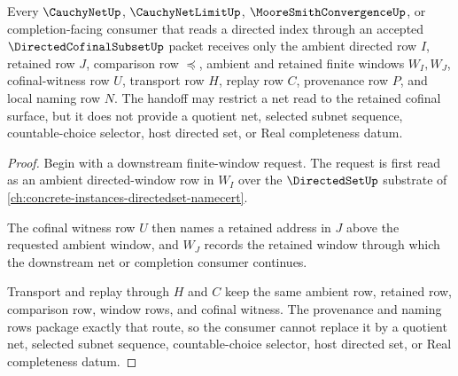 \begin{theorem}
\label{thm:directed-cofinal-subset-net-handoff}
Every $\CauchyNetUp$, $\CauchyNetLimitUp$, $\MooreSmithConvergenceUp$, or completion-facing consumer that reads a directed index through an accepted $\DirectedCofinalSubsetUp$ packet receives only the ambient directed row $I$, retained row $J$, comparison row $\preceq$, ambient and retained finite windows $W_I,W_J$, cofinal-witness row $U$, transport row $H$, replay row $C$, provenance row $P$, and local naming row $N$. The handoff may restrict a net read to the retained cofinal surface, but it does not provide a quotient net, selected subnet sequence, countable-choice selector, host directed set, or Real completeness datum.
\end{theorem}
\begin{proof}
Begin with a downstream finite-window request. The request is first read as an ambient directed-window row in $W_I$ over the $\DirectedSetUp$ substrate of \autoref{ch:concrete-instances-directedset-namecert}.

The cofinal witness row $U$ then names a retained address in $J$ above the requested ambient window, and $W_J$ records the retained window through which the downstream net or completion consumer continues.

Transport and replay through $H$ and $C$ keep the same ambient row, retained row, comparison row, window rows, and cofinal witness. The provenance and naming rows package exactly that route, so the consumer cannot replace it by a quotient net, selected subnet sequence, countable-choice selector, host directed set, or Real completeness datum.
\end{proof}

\begin{closurestatus}{\DirectedCofinalSubsetUp}
  \theoryclosure{\seedClosure}
  \formalstatus{\unformalizedV}
\end{closurestatus}
